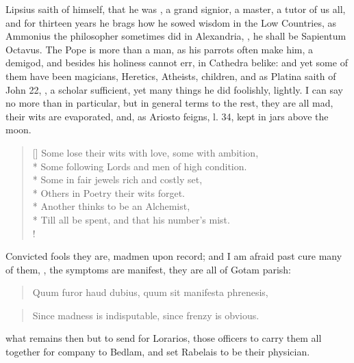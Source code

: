 Lipsius saith of himself, that he was , a grand signior, a master, a tutor of us all,
and for thirteen years he brags how he sowed wisdom in the Low
Countries, as Ammonius the philosopher sometimes did in Alexandria,
, he shall be \textlatin{Sapientum Octavus}. The Pope is more than a man,
as his parrots often make him, a demigod, and besides his holiness
cannot err, in Cathedra belike: and yet some of them have been
magicians, Heretics, Atheists, children, and as Platina saith of John
22, , a scholar sufficient,
yet many things he did foolishly, lightly. I can say no more than in
particular, but in general terms to the rest, they are all mad, their
wits are evaporated, and, as Ariosto feigns, l. 34, kept in jars above
the moon.
%
\settowidth{\versewidth}{Till all be spent, and that his number's mist.}
\begin{verse}[\versewidth]
Some lose their wits with love, some with ambition,\\*
Some following Lords and men of high condition.\\*
Some in fair jewels rich and costly set,\\*
Others in Poetry their wits forget.\\*
Another thinks to be an Alchemist,\\*
Till all be spent, and that his number's mist.\\!
\end{verse}

Convicted fools they are, madmen upon record; and I am afraid past cure
many of them, , the symptoms are manifest, they are
all of Gotam parish:

\begin{quote}
\textlatin{Quum furor haud dubius, quum sit manifesta phrenesis,}
\end{quote}

\begin{quote}
Since madness is indisputable, since frenzy is obvious.
\end{quote}

what remains then but to send for Lorarios, those officers to
carry them all together for company to Bedlam, and set Rabelais to be
their physician.

